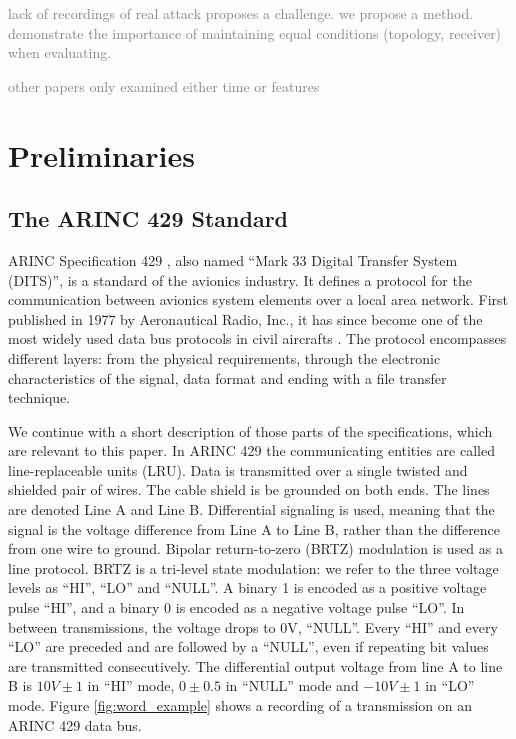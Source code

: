 \documentclass[conference]{IEEEtran}
\begin{document}
  \textcolor{gray}{lack of recordings of real attack proposes a challenge. we propose a method. demonstrate the importance of maintaining equal conditions (topology, receiver) when evaluating.}
  
  \textcolor{gray}{other papers only examined either time or features}

\section{Preliminaries}
\subsection{The ARINC 429 Standard}
  ARINC Specification 429 \cite{arinc2004arinc429}, also named ``Mark 33 Digital Transfer System (DITS)'', is a standard of the avionics industry. It defines a protocol for the communication between avionics system elements over a local area network. First published in 1977 by Aeronautical Radio, Inc., it has since become one of the most widely used data bus protocols in civil aircrafts \cite{MoirIan2013DBN}. The protocol encompasses different layers: from the physical requirements, through the electronic characteristics of the signal, data format and ending with a file transfer technique.

  We continue with a short description of those parts of the specifications, which are relevant to this paper. In ARINC 429 the communicating entities are called line-replaceable units (LRU). Data is transmitted over a single twisted and shielded pair of wires. The cable shield is be grounded on both ends. The lines are denoted Line A and Line B. Differential signaling is used, meaning that the signal is the voltage difference from Line A to Line B, rather than the difference from one wire to ground. Bipolar return-to-zero (BRTZ) modulation is used as a line protocol. BRTZ is a tri-level state modulation: we refer to the three voltage levels as ``HI'', ``LO'' and ``NULL''. A binary 1 is encoded as a positive voltage pulse ``HI'', and a binary 0 is encoded as a negative voltage pulse ``LO''. In between transmissions, the voltage drops to 0V, ``NULL''. Every ``HI'' and every ``LO'' are preceded and are followed by a ``NULL'', even if repeating bit values are transmitted consecutively. The differential output voltage from line A to line B is $10V \pm 1$ in ``HI'' mode, $0 \pm 0.5$ in ``NULL'' mode and $-10V \pm 1$ in ``LO'' mode.  Figure \ref{fig:word_example} shows a recording of a transmission on an ARINC 429 data bus.
  
\end{document}
